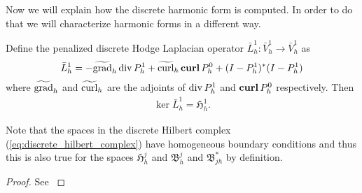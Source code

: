 \documentclass[../master_thesis.tex]{subfiles}
\begin{document}
Now we will explain how the discrete harmonic form is computed.
In order to do that we will characterize harmonic forms in a different way.
\begin{proposition}
    Define the penalized discrete Hodge Laplacian operator $\bar{L}^1_h: \bar{V}^1_h \rightarrow \bar{V}^1_h$ as
    \begin{align*}
        \bar{L}^1_h = -\widetilde{\grad}_h \diver P^1_h + \widetilde{\curl}_h \veccurl P ^0_h
            + (I - P^1_h)^* (I-P^1_h)
    \end{align*}
    where $\widetilde{\operatorname{grad}}_h$ and $\widetilde{\operatorname{curl}}_h$ are the adjoints 
    of $\operatorname{div} P^1_h$ and $\veccurl P^0_h$ respectively. 
    Then 
    \begin{align*}
        \ker \bar{L}^1_h = \mathfrak{H}^1_h.
    \end{align*}
\end{proposition}
Note that the spaces in the discrete Hilbert complex (\ref{eq:discrete_hilbert_complex}) 
have homogeneous boundary conditions and thus 
this is also true for the spaces $\mathfrak{H}^j_h$ and $\mathfrak{B}^j_h$ and 
$\mathfrak{B}^*_{jh}$ by definition.
\begin{proof}
    See \cite[Thm.\,3.2]{broken_hodge_laplace_problems}
\end{proof}
\end{document}
